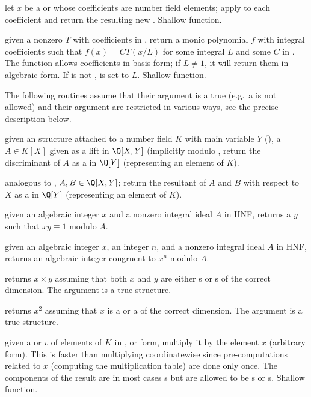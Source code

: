  let $x$ be a  or
 whose coefficients
are number field elements; apply  to each
coefficient and return the resulting new . Shallow function.

 given a nonzero  $T$
with coefficients in , return a monic polynomial $f$ with integral
coefficients such that $f(x) = C T(x/L)$ for some integral $L$ and some $C$
in . The function allows coefficients in basis form; if $L \neq 1$,
it will return them in algebraic form. If  is not ,
 is set to $L$. Shallow function.

 The following routines assume that their 
argument is a true  (e.g.~a  is not allowed) and their
argument are restricted in various ways, see the precise description below.

 given an  structure attached to a
number field $K$ with main variable $Y$ (), a 
$A \in K[X]$ given as a lift in $\Q[X,Y]$ (implicitly modulo
, return the discriminant of $A$ as a  in
$\Q[Y]$ (representing an element of $K$).

 analogous to ,
$A, B\in \Q[X,Y]$; return the resultant of $A$ and $B$ with respect to $X$
as a  in $\Q[Y]$ (representing an element of $K$).

 given an algebraic integer
$x$ and a nonzero integral ideal $A$ in HNF, returns a $y$ such that
$xy \equiv 1$ modulo $A$.

 given an algebraic
integer $x$, an integer $n$, and a nonzero integral ideal $A$ in HNF,
returns an algebraic integer congruent to $x^n$ modulo $A$.

 returns $x\times y$ assuming
that both $x$ and $y$ are either s or s of the correct
dimension. The argument  is a true  structure.

 returns $x^2$ assuming that $x$ is a
 or a  of the correct dimension. The argument  is a
true  structure.

 given a  or 
$v$ of elements of $K$ in ,  or  form, multiply
it by the element $x$ (arbitrary form). This is faster than multiplying
coordinatewise since pre-computations related to $x$ (computing the
multiplication table) are done only once. The components of the result
are in most cases s but are allowed to be s or s.
Shallow function.


